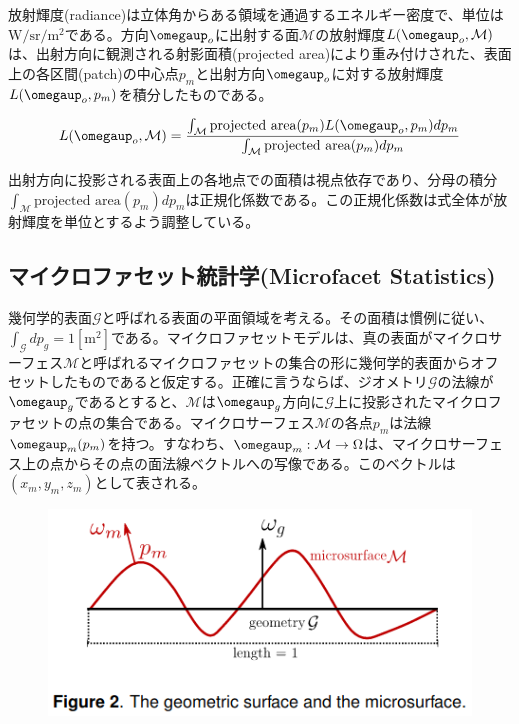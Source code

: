 \documentclass[a4paper,xelatex,ja=standard]{bxjsarticle}
\begin{document}
放射輝度(radiance)は立体角からある領域を通過するエネルギー密度で、単位は$\text{W}/\text{sr}/\text{m}^2$である。方向$\boldsymbol{\omegaup}_o$に出射する面$\mathcal M$の放射輝度$L(\boldsymbol{\omegaup}_o, \mathcal{M})$は、出射方向に観測される射影面積(projected area)により重み付けされた、表面上の各区間(patch)の中心点$p_m$と出射方向$\boldsymbol{\omegaup}_o$に対する放射輝度$L(\boldsymbol{\omegaup}_o, p_m)$を積分したものである。

\begin{equation}
    L(\boldsymbol{\omegaup}_o, \mathcal{M}) = \frac{\int_{\mathcal M} \text{projected area}(p_m) L(\boldsymbol{\omegaup}_o, p_m) dp_m}{\int_{\mathcal M} \text{projected area}(p_m) dp_m}
    \label{eq:1}
\end{equation}

出射方向に投影される表面上の各地点での面積は視点依存であり、分母の積分$\int_{\mathcal M} \text{projected area}(p_m) dp_m$は正規化係数である。この正規化係数は式全体が放射輝度を単位とするよう調整している。

\subsection{マイクロファセット統計学(Microfacet Statistics)}

幾何学的表面$\mathcal G$と呼ばれる表面の平面領域を考える。その面積は慣例に従い、$\int_{\mathcal G}dp_g = 1 [\text{m}^2]$である。マイクロファセットモデルは、真の表面がマイクロサーフェス$\mathcal M$と呼ばれるマイクロファセットの集合の形に幾何学的表面からオフセットしたものであると仮定する。正確に言うならば、ジオメトリ$\mathcal G$の法線が$\boldsymbol{\omegaup}_g$であるとすると、$\mathcal M$は$\boldsymbol{\omegaup}_g$方向に$\mathcal G$上に投影されたマイクロファセットの点の集合である。マイクロサーフェス$\mathcal M$の各点$p_m$は法線$\boldsymbol{\omegaup}_m(p_m)$を持つ。すなわち、$\boldsymbol{\omegaup}_m : \mathcal{M} \rightarrow \Omega$は、マイクロサーフェス上の点からその点の面法線ベクトルへの写像である。このベクトルは$(x_m, y_m, z_m)$として表される。

\begin{figure}
    \includegraphics[width=\textwidth]{Figure2.png}
    \caption{}
    \label{fig:2}
\end{figure}
\end{document}
